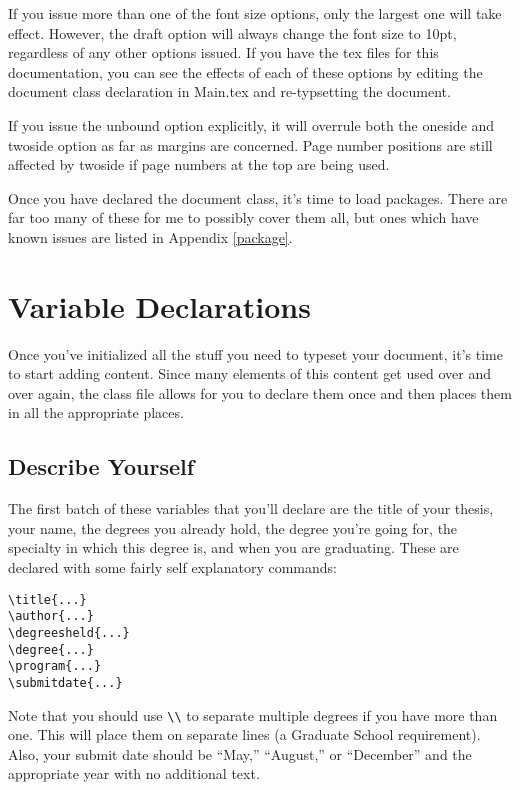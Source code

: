 If you issue more than one of the font size options, only the largest one will take effect.  However, the draft option will always change the font size to 10pt, regardless of any other options issued.  If you have the tex files for this documentation, you can see the effects of each of these options by editing the document class declaration in Main.tex and re-typsetting the document.

If you issue the unbound option explicitly, it will overrule both the oneside and twoside option as far as margins are concerned.  Page number positions are still affected by twoside if page numbers at the top are being used.

Once you have declared the document class, it's time to load packages.  There are far too many of these for me to possibly cover them all, but ones which have known issues are listed in Appendix \ref{package}.

\section{Variable Declarations}

Once you've initialized all the stuff you need to typeset your document, it's time to start adding content.  Since many elements of this content get used over and over again, the class file allows for you to declare them once and then places them in all the appropriate places.

\subsection{Describe Yourself}\label{self}
The first batch of these variables that you'll declare are the title of your thesis, your name, the degrees you already hold, the degree you're going for, the specialty in which this degree is, and when you are graduating.  These are declared with some fairly self explanatory commands:

\begin{verbatim}
\title{...}
\author{...}
\degreesheld{...}
\degree{...}
\program{...}
\submitdate{...}
\end{verbatim}

Note that you should use \verb=\\= to separate multiple degrees if you have more than one.  This will place them on separate lines (a Graduate School requirement).  Also, your submit date should be ``May,'' ``August,'' or ``December'' and the appropriate year with no additional text.

